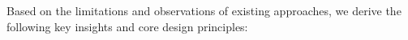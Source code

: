 




Based on the limitations and observations of existing approaches, we derive the following key insights and core design principles:

